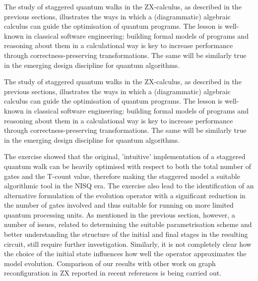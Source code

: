  The study of staggered quantum walks in the ZX-calculus, as described in the previous sections, illustrates the ways in which a (diagrammatic) algebraic calculus can guide the optimisation of quantum programs. The lesson is well-known in classical software engineering: building formal models of programs and reasoning about them in a calculational way is key to increase performance through correctness-preserving transformations. The same will be similarly true in the emerging design discipline for quantum algorithms.



 The study of staggered quantum walks in the ZX-calculus, as described in the previous sections, illustrates the ways in which a (diagrammatic) algebraic calculus can guide the optimisation of quantum programs. The lesson is well-known in classical software engineering: building formal models of programs and reasoning about them in a calculational way is key to increase performance through correctness-preserving transformations. The same will be similarly true in the emerging design discipline for quantum algorithms.




The exercise showed that the original, 'intuitive' implementation of a staggered quantum walk can be heavily optimised with respect to both the total number of gates and the T-count value, therefore making the staggered model a suitable algorithmic tool in the NISQ era\cite{Preskill2018}. The exercise also lead to the identification of an alternative formulation of the evolution operator with a significant reduction in the number of gates involved and thus suitable for running on more limited quantum processing units. As mentioned in the previous section, however, a number of issues, related to determining the  suitable parametrisation scheme and better understanding the structure of the initial and final stages in the resulting circuit,  still require further investigation. Similarly, it is not completely  clear how the choice of the initial state 
influences how well the operator approximates the model evolution. Comparison of our results with other work on graph reconfiguration in ZX reported in recent references \cite{Dun20,Ufr23} is being carried out.


